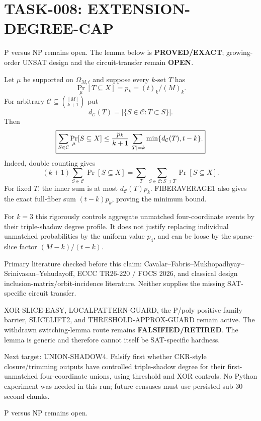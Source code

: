 \documentclass[11pt]{article}
\begin{document}
\section*{TASK-008: EXTENSION-DEGREE-CAP}
P versus NP remains open. The lemma below is \textbf{PROVED/EXACT}; growing-order UNSAT design and the circuit-transfer remain \textbf{OPEN}.

Let $\mu$ be supported on $\Omega_{M,t}$ and suppose every $k$-set $T$ has
\[
\Pr_\mu[T\subseteq X]=p_k=(t)_k/(M)_k.
\]
For arbitrary $\mathcal C\subseteq\binom{[M]}{k+1}$ put
\[
d_{\mathcal C}(T)=|\{S\in\mathcal C:T\subset S\}|.
\]
Then
\[
\boxed{\sum_{S\in\mathcal C}\Pr_\mu[S\subseteq X]
\le {p_k\over k+1}\sum_{|T|=k}\min\{d_{\mathcal C}(T),t-k\}.}
\]
Indeed, double counting gives
\[
(k+1)\sum_{S\in\mathcal C}\Pr[S\subseteq X]
=\sum_T\sum_{S\in\mathcal C:S\supset T}\Pr[S\subseteq X].
\]
For fixed $T$, the inner sum is at most $d_{\mathcal C}(T)p_k$. FIBERAVERAGE1 also gives the exact full-fiber sum $(t-k)p_k$, proving the minimum bound.

For $k=3$ this rigorously controls aggregate unmatched four-coordinate events by their triple-shadow degree profile. It does not justify replacing individual unmatched probabilities by the uniform value $p_4$, and can be loose by the sparse-slice factor $(M-k)/(t-k)$.

Primary literature checked before this claim: Cavalar--Fabris--Mukhopadhyay--Srinivasan--Yehudayoff, ECCC TR26-220 / FOCS 2026, and classical design inclusion-matrix/orbit-incidence literature. Neither supplies the missing SAT-specific circuit transfer.

XOR-SLICE-EASY, LOCALPATTERN-GUARD, the P/poly positive-family barrier, SLICELIFT2, and THRESHOLD-APPROX-GUARD remain active. The withdrawn switching-lemma route remains \textbf{FALSIFIED/RETIRED}. The lemma is generic and therefore cannot itself be SAT-specific hardness.

Next target: UNION-SHADOW4. Falsify first whether CKR-style closure/trimming outputs have controlled triple-shadow degree for their first-unmatched four-coordinate unions, using threshold and XOR controls. No Python experiment was needed in this run; future censuses must use persisted sub-30-second chunks.

P versus NP remains open.
\end{document}

